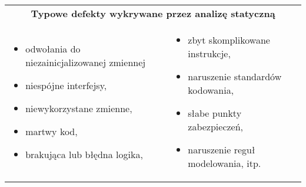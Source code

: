 \documentclass[../main.tex]{subfiles}
\begin{document}
    \begin{table}[H]
        \begin{center}
            \begin{tabular}{ p{8cm} p{8cm}}
                \multicolumn{2}{c}{\textbf{Typowe defekty wykrywane przez analizę statyczną}} \\
                \begin{itemize}
                    \item odwołania do niezainicjalizowanej zmiennej
                    \item niespójne interfejsy,
                    \item niewykorzystane zmienne,
                    \item martwy kod,
                    \item brakująca lub błędna logika,
                \end{itemize} &
                \begin{itemize}
                    \item zbyt skomplikowane instrukcje,
                    \item naruszenie standardów kodowania,
                    \item słabe punkty zabezpieczeń,
                    \item naruszenie reguł modelowania, itp.
                \end{itemize}
            \end{tabular}
        \end{center}
    \end{table}
\end{document}
